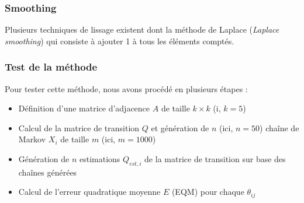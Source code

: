 \documentclass[a4paper,titlepage]{report}
\begin{document}
\subsubsection{Smoothing}
Plusieurs techniques de lissage existent dont la méthode de Laplace (\textit{Laplace smoothing}) qui consiste à ajouter 1 à tous les éléments comptés.
\subsubsection{Test de la méthode}
Pour tester cette méthode, nous avons procédé en plusieurs étapes : 
\begin{itemize}
	\item Définition d'une matrice d'adjacence $A$ de taille $k \times k$ (i, $k = 5$)
	\item Calcul de la matrice de transition $Q$ et génération de $n$ (ici, $n = 50$) chaîne de Markov $X_i$ de taille $m$ (ici, $m = 1000$)
	\item Génération de $n$ estimations $Q_{est,i}$ de la matrice de transition sur base des chaînes générées
	\item Calcul de l'erreur quadratique moyenne $E$ (EQM) pour chaque $\theta_{ij}$ 
\end{itemize}
\end{document}
